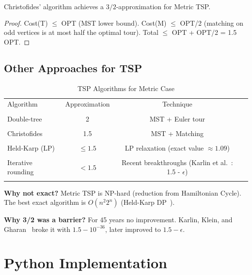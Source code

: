 \begin{theorem}
Christofides' algorithm achieves a $3/2$-approximation for Metric TSP.
\end{theorem}
\begin{proof}
Cost(T) $\leq$ OPT (MST lower bound). Cost(M) $\leq$ OPT/2 (matching on odd vertices is at most half the optimal tour). Total $\leq$ OPT + OPT/2 = 1.5 OPT.
\end{proof}

\subsection{Other Approaches for TSP}

\begin{table}[H]
\centering
\caption{TSP Algorithms for Metric Case}
\begin{tabular}{lccc}
\toprule
Algorithm & Approximation & Technique \\\\
\midrule
Double-tree & 2 & MST + Euler tour \\\\
Christofides & 1.5 & MST + Matching \\\\
Held-Karp (LP) & $\leq 1.5$ & LP relaxation (exact value $\approx 1.09$) \\\\
Iterative rounding & $< 1.5$ & Recent breakthroughs (Karlin et al.~\cite{karlin21}: 1.5 - $\epsilon$) \\\\
\bottomrule
\end{tabular}
\end{table}

\textbf{Why not exact?} Metric TSP is NP-hard (reduction from Hamiltonian Cycle). The best exact algorithm is $O(n^2 2^n)$ (Held-Karp DP~\cite{held-karp62}).

\textbf{Why 3/2 was a barrier?} For 45 years no improvement. Karlin, Klein, and Gharan~\cite{karlin21} broke it with $1.5 - 10^{-36}$, later improved to $1.5 - \epsilon$.

\section{Python Implementation}

